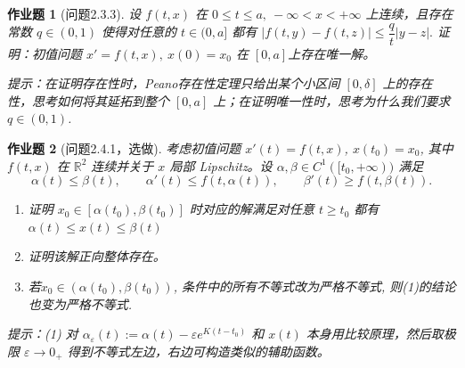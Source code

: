 \documentclass[UTF8,fontset=windows,12pt]{ctexart}
\theoremstyle{kaiti-theorem}
\newtheorem{problem}{作业题}
\numberwithin{equation}{section}
\newcommand{\R}{\mathbb{R}}
\newcommand{\eps}{\varepsilon}
\begin{document}
\begin{problem}[问题2.3.3]
设 $f(t,x)$ 在 $0\leqslant t\leqslant a,\ -\infty<x<+\infty$ 上连续，且存在常数 $q\in (0,1)$ 使得对任意的 $t\in (0,a]$ 都有 $ |f(t,y)-f(t,z)| \leqslant \dfrac{q}{t}|y-z|.$ 证明：初值问题 $x'=f(t,x),\ x(0)=x_0$ 在 $[0,a]$上存在唯一解。

提示：在证明存在性时，Peano存在性定理只给出某个小区间 $[0,\delta]$ 上的存在性，思考如何将其延拓到整个 $[0,a]$ 上；在证明唯一性时，思考为什么我们要求$q\in(0,1)$.
\end{problem}


\begin{problem}[问题2.4.1，选做]
考虑初值问题 $x'(t)=f(t,x)$, $x(t_0)=x_0$, 其中 $f(t,x)$ 在 $\R^2$ 连续并关于 \(x\) 局部 Lipschitz。设 $\alpha,\beta\in C^1([t_0,+\infty))$ 满足
\[
 \alpha(t)\leqslant\beta(t),\qquad \alpha'(t)\leqslant f(t,\alpha(t)), \qquad \beta'(t)\geqslant f(t,\beta(t)).
\]
\begin{enumerate}
 \item [(1)] 证明 $x_0\in[\alpha(t_0),\beta(t_0)]$ 时对应的解满足对任意 $t\geqslant t_0$ 都有 $\alpha(t)\leqslant x(t)\leqslant\beta(t)$
 \item [(2)] 证明该解正向整体存在。
 \item [(3)] 若$x_0\in(\alpha(t_0),\beta(t_0))$, 条件中的所有不等式改为严格不等式, 则(1)的结论也变为严格不等式.
\end{enumerate}

提示：(1) 对 $\alpha_\eps(t):=\alpha(t)-\eps e^{K(t-t_0)}$ 和 $x(t)$ 本身用比较原理，然后取极限 $\eps\to 0_+$ 得到不等式左边，右边可构造类似的辅助函数。
\end{problem}
\end{document}
